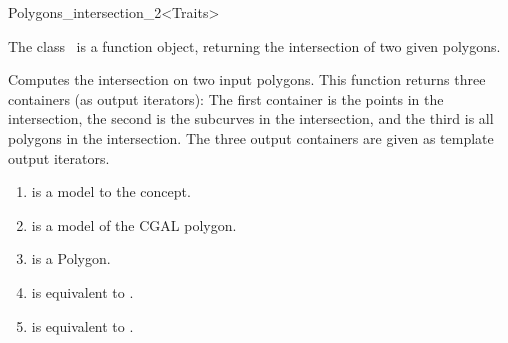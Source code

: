 
\ccRefPageBegin



\begin{ccRefFunctionObjectClass}{Polygons_intersection_2<Traits>}
\label{OVL_sec:polygon_intersection}
    
\ccDefinition
The class \ccClassTemplateName\ is a function object,
returning the intersection of two given polygons.




{Computes the intersection on two input polygons.
This function returns three containers (as output iterators):
The first container is the points in the intersection, 
the second is the subcurves in the intersection,
and the third is all polygons in the intersection.
The three output containers are given as template
output iterators.
}

\begin{enumerate}
   \item
    is a model to the  concept.
   \item
    is a model of the CGAL polygon.
   \item
    is a Polygon.
   \item    
    is equivalent to .
   \item
    is equivalent to .
\end{enumerate}


\end{ccRefFunctionObjectClass}
